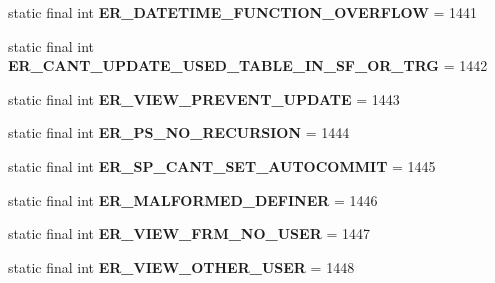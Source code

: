 \begin{DoxyCompactItemize}
static final int {\bfseries E\+R\+\_\+\+D\+A\+T\+E\+T\+I\+M\+E\+\_\+\+F\+U\+N\+C\+T\+I\+O\+N\+\_\+\+O\+V\+E\+R\+F\+L\+OW} = 1441
\item 
\mbox{\label{classcom_1_1mysql_1_1jdbc_1_1_mysql_error_numbers_ad6cb889e370f8603e42a5ab1eaf73442}} 
static final int {\bfseries E\+R\+\_\+\+C\+A\+N\+T\+\_\+\+U\+P\+D\+A\+T\+E\+\_\+\+U\+S\+E\+D\+\_\+\+T\+A\+B\+L\+E\+\_\+\+I\+N\+\_\+\+S\+F\+\_\+\+O\+R\+\_\+\+T\+RG} = 1442
\item 
\mbox{\label{classcom_1_1mysql_1_1jdbc_1_1_mysql_error_numbers_a8eb7edd071582b592fba138d1258d1c8}} 
static final int {\bfseries E\+R\+\_\+\+V\+I\+E\+W\+\_\+\+P\+R\+E\+V\+E\+N\+T\+\_\+\+U\+P\+D\+A\+TE} = 1443
\item 
\mbox{\label{classcom_1_1mysql_1_1jdbc_1_1_mysql_error_numbers_a77ecbcb1735d801df1c09e85c13f73f9}} 
static final int {\bfseries E\+R\+\_\+\+P\+S\+\_\+\+N\+O\+\_\+\+R\+E\+C\+U\+R\+S\+I\+ON} = 1444
\item 
\mbox{\label{classcom_1_1mysql_1_1jdbc_1_1_mysql_error_numbers_a3d01a0693d2907a9ee2b643bb279d8ea}} 
static final int {\bfseries E\+R\+\_\+\+S\+P\+\_\+\+C\+A\+N\+T\+\_\+\+S\+E\+T\+\_\+\+A\+U\+T\+O\+C\+O\+M\+M\+IT} = 1445
\item 
\mbox{\label{classcom_1_1mysql_1_1jdbc_1_1_mysql_error_numbers_a9befe433a685cffe60ba131253a09768}} 
static final int {\bfseries E\+R\+\_\+\+M\+A\+L\+F\+O\+R\+M\+E\+D\+\_\+\+D\+E\+F\+I\+N\+ER} = 1446
\item 
\mbox{\label{classcom_1_1mysql_1_1jdbc_1_1_mysql_error_numbers_a0f002fe5359846792809c799b1543264}} 
static final int {\bfseries E\+R\+\_\+\+V\+I\+E\+W\+\_\+\+F\+R\+M\+\_\+\+N\+O\+\_\+\+U\+S\+ER} = 1447
\item 
\mbox{\label{classcom_1_1mysql_1_1jdbc_1_1_mysql_error_numbers_a813d4bab5d55b4927085948d2b226468}} 
static final int {\bfseries E\+R\+\_\+\+V\+I\+E\+W\+\_\+\+O\+T\+H\+E\+R\+\_\+\+U\+S\+ER} = 1448

\end{DoxyCompactItemize}
